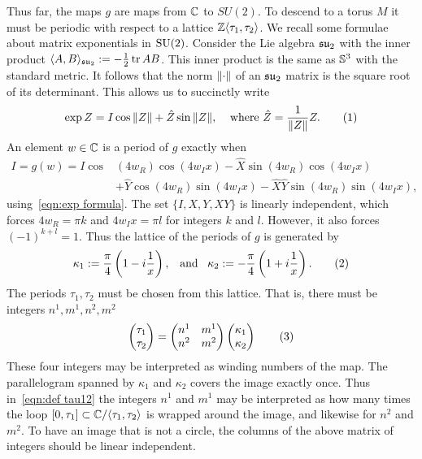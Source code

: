 \documentclass{article}
\begin{document}
Thus far, the maps $g$ are maps from $\C$ to $SU(2)$. To descend to a torus $M$ it must be periodic with respect to a lattice $\Z\langle \tau_1,\tau_2\rangle$. We recall some formulae about matrix exponentials in $\SU(2)$. Consider the Lie algebra $\su_2$ with the inner product $\langle A, B \rangle_{\su_2} := -\tfrac{1}{2}\tr AB$. This inner product is the same as $\S^3$ with the standard metric. It follows that the norm $\norm{\cdot}$ of an $\su_2$ matrix is the square root of its determinant. This allows us to succinctly write 
\[
    \exp Z = I \cos \norm{Z} + \hat{Z} \sin \norm{Z},
    \;\;\;\;
    \text{where }\hat{Z} = \frac{1}{\norm{Z}} Z.
\labelthis{eqn:exp formula}
\]
An element $w\in\C$ is a period of $g$ exactly when
\begin{align*}
I = g(w) = I \cos&(4 w_R)\cos(4 w_I x)
- \hat{X}\sin(4 w_R)\cos(4 w_I x) \\
&+ \hat{Y}\cos(4 w_R)\sin(4 w_I x)
- \hat{X}\hat{Y}\sin(4w_R)\sin(4 w_I x),
\end{align*}
using~\eqref{eqn:exp formula}. The set $\{I,X,Y,XY\}$ is linearly independent, which forces 
$4w_R = \pi k$ and $4 w_I x = \pi l$ for integers $k$ and $l$. However, it also forces $(-1)^{k+l} = 1$.
Thus the lattice of the periods of $g$ is generated by
\[
\kappa_1 := \frac{\pi}{4}\bra{1 - \iu\frac{1}{x}},
\;\;\;\text{and}\;\;\;
\kappa_2 := -\frac{\pi}{4}\bra{1 + \iu\frac{1}{x}}.
\labelthis{eqn:def kappa12}
\]
The periods $\tau_1,\tau_2$ must be chosen from this lattice.
That is, there must be integers $n^1,m^1,n^2,m^2$
\[
\begin{pmatrix}
\tau_1 \\ \tau_2
\end{pmatrix}
= 
\begin{pmatrix}
n^1 & m^1 \\
n^2 & m^2
\end{pmatrix}
\begin{pmatrix}
\kappa_1 \\ \kappa_2
\end{pmatrix}
\labelthis{eqn:def tau12}
\]
These four integers may be interpreted as winding numbers of the map. The parallelogram spanned by $\kappa_1$ and $\kappa_2$ covers the image exactly once. Thus in~\eqref{eqn:def tau12} the integers $n^1$ and $m^1$ may be interpreted as how many times the loop $[0,\tau_1] \subset \C/\langle \tau_1,\tau_2 \rangle$ is wrapped around the image, and likewise for $n^2$ and $m^2$.
To have an image that is not a circle, the columns of the above matrix of integers should be linear independent. 
\end{document}

